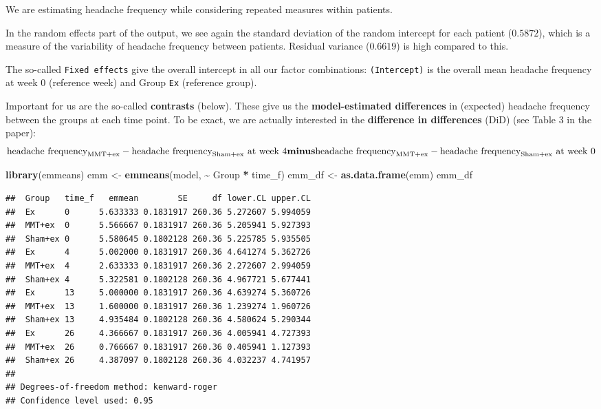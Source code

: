 \documentclass[
]{book}
\newenvironment{Shaded}{\begin{snugshade}}{\end{snugshade}}
\newcommand{\FunctionTok}[1]{\textcolor[rgb]{0.13,0.29,0.53}{\textbf{#1}}}
\newcommand{\NormalTok}[1]{#1}
\newcommand{\OtherTok}[1]{\textcolor[rgb]{0.56,0.35,0.01}{#1}}
\newcommand{\SpecialCharTok}[1]{\textcolor[rgb]{0.81,0.36,0.00}{\textbf{#1}}}
\begin{document}
We are estimating headache frequency while considering repeated measures within patients.

In the random effects part of the output, we see again the standard
deviation of the random intercept for each patient (\(0.5872\)),
which is a measure of the variability of headache frequency between patients.
Residual variance (\(0.6619\)) is high compared to this.

The so-called \texttt{Fixed\ effects} give the overall intercept in all
our factor combinations: \texttt{(Intercept)} is the overall mean headache frequency at week \(0\) (reference week)
and Group \texttt{Ex} (reference group).

Important for us are the so-called \textbf{contrasts} (below).
These give us the \textbf{model-estimated differences} in (expected) headache frequency between
the groups at each time point. To be exact, we are actually interested in
the \textbf{difference in differences} (DiD) (see Table 3 in the paper):
\[
\text{headache frequency}_{\text{MMT+ex}} - \text{headache frequency}_{\text{Sham+ex}} \text{ at week } 4 \\
\textbf{minus} \\ 
\text{headache frequency}_{\text{MMT+ex}} - \text{headache frequency}_{\text{Sham+ex}} \text{ at week } 0
\]

\begin{Shaded}
\begin{Highlighting}[]
\FunctionTok{library}\NormalTok{(emmeans)}
\NormalTok{emm }\OtherTok{\textless{}{-}} \FunctionTok{emmeans}\NormalTok{(model, }\SpecialCharTok{\textasciitilde{}}\NormalTok{ Group }\SpecialCharTok{*}\NormalTok{ time\_f)}
\NormalTok{emm\_df }\OtherTok{\textless{}{-}} \FunctionTok{as.data.frame}\NormalTok{(emm)}
\NormalTok{emm\_df}
\end{Highlighting}
\end{Shaded}

\begin{verbatim}
##  Group   time_f   emmean        SE     df lower.CL upper.CL
##  Ex      0      5.633333 0.1831917 260.36 5.272607 5.994059
##  MMT+ex  0      5.566667 0.1831917 260.36 5.205941 5.927393
##  Sham+ex 0      5.580645 0.1802128 260.36 5.225785 5.935505
##  Ex      4      5.002000 0.1831917 260.36 4.641274 5.362726
##  MMT+ex  4      2.633333 0.1831917 260.36 2.272607 2.994059
##  Sham+ex 4      5.322581 0.1802128 260.36 4.967721 5.677441
##  Ex      13     5.000000 0.1831917 260.36 4.639274 5.360726
##  MMT+ex  13     1.600000 0.1831917 260.36 1.239274 1.960726
##  Sham+ex 13     4.935484 0.1802128 260.36 4.580624 5.290344
##  Ex      26     4.366667 0.1831917 260.36 4.005941 4.727393
##  MMT+ex  26     0.766667 0.1831917 260.36 0.405941 1.127393
##  Sham+ex 26     4.387097 0.1802128 260.36 4.032237 4.741957
## 
## Degrees-of-freedom method: kenward-roger 
## Confidence level used: 0.95
\end{verbatim}
\end{document}
